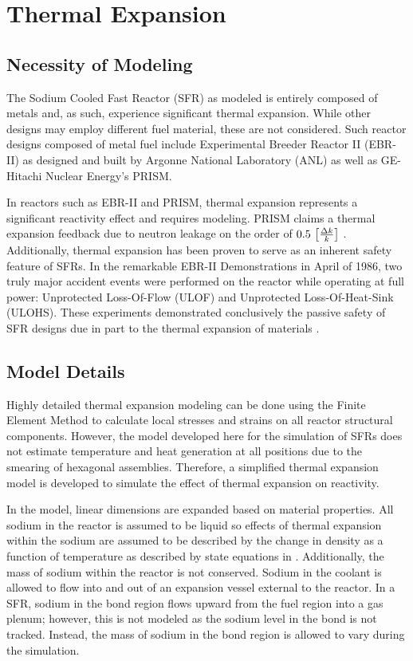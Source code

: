 \chapter{Thermal Expansion}
\label{ch:thermalExpansion}

\section{Necessity of Modeling}
  The Sodium Cooled Fast Reactor (SFR) as modeled is entirely composed of
  metals and, as such, experience significant thermal expansion. While other 
  designs may employ different fuel material, these are not considered. Such
  reactor designs composed of metal fuel include Experimental Breeder Reactor II
  (EBR-II) as designed and built by Argonne National Laboratory (ANL) as well as
  GE-Hitachi Nuclear Energy's PRISM. 

  In reactors such as EBR-II and PRISM, thermal expansion represents a
  significant reactivity effect and requires modeling. PRISM claims a thermal
  expansion feedback due to neutron leakage on the order of $0.5
  \,\left[\text{{$\frac{\Delta k}{k}$}}\right]$ \cite{GEFR793}. Additionally, thermal
  expansion has been proven to serve as an inherent safety feature of SFRs. In
  the remarkable EBR-II Demonstrations in April of 1986, two truly major
  accident events were performed on the reactor while operating at full power:
  Unprotected Loss-Of-Flow (ULOF) and Unprotected Loss-Of-Heat-Sink (ULOHS).
  These experiments demonstrated conclusively the passive safety of SFR designs
  due in part to the thermal expansion of materials \cite{PlentifulEnergy}.

\section{Model Details}
  Highly detailed thermal expansion modeling can be done using the Finite
  Element Method to calculate local stresses and strains on all reactor
  structural components. However, the model developed here for the simulation of
  SFRs does not estimate temperature and heat generation at all positions due to
  the smearing of hexagonal assemblies. Therefore, a simplified thermal
  expansion model is developed to simulate the effect of thermal expansion on
  reactivity.

  In the model, linear dimensions are expanded based on material properties.
  All sodium in the reactor is assumed to be liquid so effects of thermal
  expansion within the sodium are assumed to be described by the change in
  density as a function of temperature as described by state equations in
  \cite{sodiumProp}. Additionally, the mass of sodium within the reactor is not
  conserved. Sodium in the coolant is allowed to flow into and out of an
  expansion vessel external to the reactor. In a SFR, sodium in the bond region
  flows upward from the fuel region into a gas plenum; however, this is not
  modeled as the sodium level in the bond is not tracked. Instead, the mass of
  sodium in the bond region is allowed to vary during the simulation.

